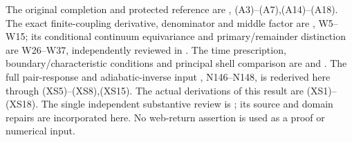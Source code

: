 \documentclass[11pt]{article}
\begin{document}
The original completion and protected reference are
, (A3)--(A7),(A14)--(A18).
The exact finite-coupling derivative, denominator and middle
factor are , W5--W15; its conditional
continuum equivariance and primary/remainder distinction are
W26--W37, independently reviewed in
.
The time prescription, boundary/characteristic conditions and
principal shell comparison are  and
.
The full pair-response and adiabatic-inverse input
, N146--N148,
is rederived here through (XS5)--(XS8),(XS15).
The actual derivations of this result are (XS1)--(XS18).
The single independent substantive review is
; its source and domain
repairs are incorporated here.
No web-return assertion is used as a proof or numerical input.
\end{document}
